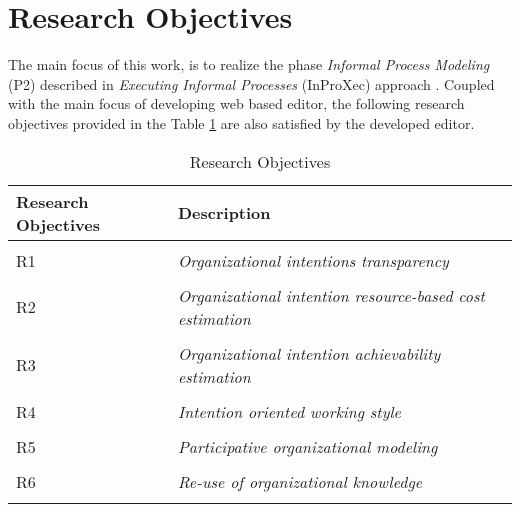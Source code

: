 \section {Research Objectives}
\label{sec:researchobjectives}
The main focus of this work, is to realize the phase \textit{Informal Process Modeling} (P2) described in \textit{Executing Informal Processes} (InProXec) approach \cite{Sungur2015}. Coupled with the main focus of developing web based editor, the following research objectives provided in the Table \ref{tab:researchobjectives} are also satisfied by the developed editor. 

\label{sec:researchobj}
\begin{center}
	\begin{longtable}{p{5cm}p{11cm}} 
   	\toprule 
	\textbf{Research Objectives} & \textbf{Description} \\
	\midrule
	\endfirsthead
	\\
	R1 & \textit{Organizational intentions transparency}  \label{ro1} \\
	\\[-1.5ex]
	R2 & \textit{Organizational intention resource-based cost estimation}  \label{ro2} \\
	\\[-1.5ex]
	R3 & \textit{Organizational intention achievability estimation} \label{ro3}\\
	\\[-1.5ex]
	R4 & \textit{Intention oriented working style}  \label{ro4}\\
	\\[-1.5ex]
	R5 & \textit{Participative organizational modeling}\label{ro5}\\
	\\[-1.5ex]
	R6 & \textit{Re-use of organizational knowledge} \label{ro6}\\	
	\bottomrule
	\caption{Research Objectives}
	\label{tab:researchobjectives}
	\end{longtable}	
\end{center}

